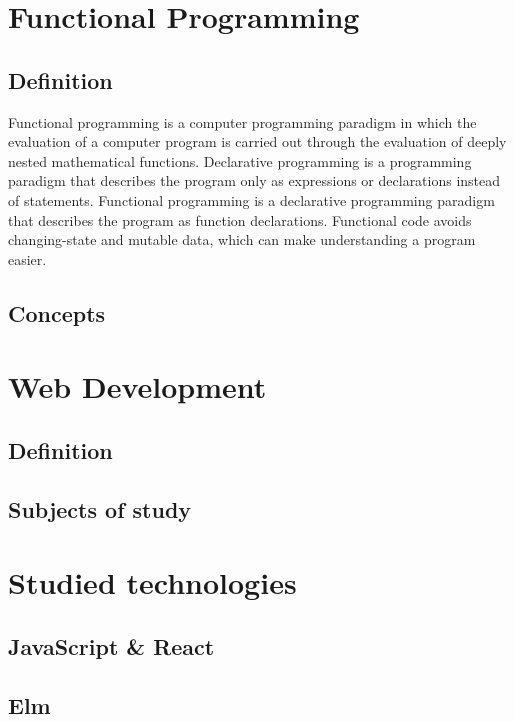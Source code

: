 \documentclass[12pt, titlepage]{article}
\begin{document}
\section{Functional Programming}

\subsection{Definition}

Functional programming is a computer programming paradigm in which the evaluation of a computer program is carried out
through the evaluation of deeply nested mathematical functions. Declarative programming is a programming paradigm that
describes the program only as expressions or declarations instead of statements. Functional programming is a declarative
programming paradigm that describes the program as function declarations. Functional code avoids changing-state and
mutable data, which can make understanding a program easier. \cite{hudak}

\subsection{Concepts}

\section{Web Development}

\subsection{Definition}

\subsection{Subjects of study}

\section{Studied technologies}
\subsection{JavaScript \& React}
\subsection{Elm}
\end{document}
